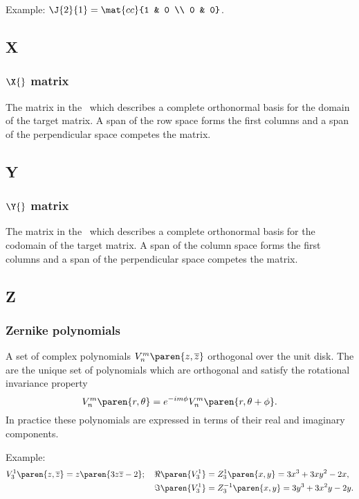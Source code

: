 Example: $\J{2}{1} = \mat{cc}{1 & 0 \\ 0 & 0}$.

\subsection*{X} 

\subsubsection*{$\X{}$ matrix}
The matrix in the \svdl \ which describes a complete orthonormal basis for the domain of the target matrix. A span of the row space forms the first columns and a span of the perpendicular space competes the matrix.


\subsection*{Y} 

\subsubsection*{$\Y{}$ matrix}
The matrix in the \svdl \ which describes a complete orthonormal basis for the codomain of the target matrix. A span of the column space forms the first columns and a span of the perpendicular space competes the matrix.

\subsection*{Z} 

\subsubsection*{Zernike polynomials}
A set of complex polynomials $V_n^m \paren{z,\overline{z}}$ orthogonal over the unit disk. The are the unique set of polynomials which are orthogonal and satisfy the rotational invariance property $$V_n^m \paren{r,\theta} = e^{ -i m \phi }V_n^m \paren{r,\theta + \phi}.$$
In practice these polynomials are expressed in terms of their real and imaginary components.

Example: \\
\begin{equation*}
  \begin{split}
V_3^1 \paren{z,\overline{z}} = z\paren{3z\overline{z}-2}; \quad 
\Re\paren{V_3^1} &= Z_3^{1}\paren{x,y} = 3x^3+3xy^2-2x, \\ 
\Im\paren{V_3^1} &= Z_3^{-1}\paren{x,y} = 3y^3+3x^2y-2y. \\   
  \end{split}
\end{equation*}

